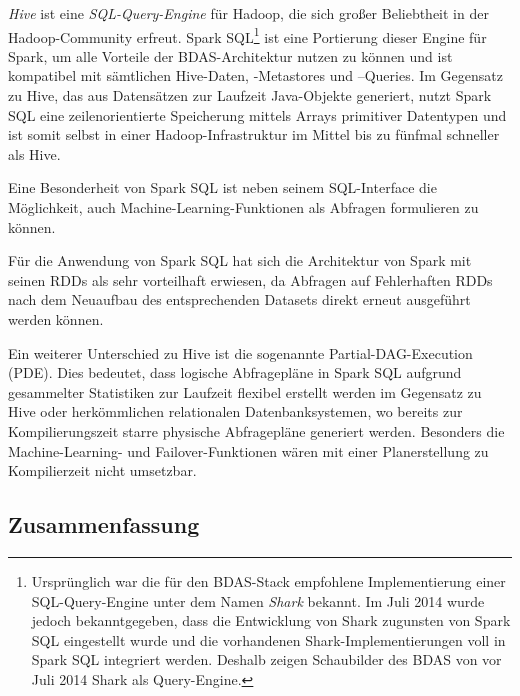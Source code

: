\textit{Hive} ist eine \textit{SQL-Query-Engine} für Hadoop, die sich großer Beliebtheit in der Hadoop-Community erfreut. Spark SQL\footnote{Ursprünglich war die für den BDAS-Stack empfohlene Implementierung einer SQL-Query-Engine unter dem Namen \textit{Shark} bekannt. Im Juli 2014 wurde jedoch bekanntgegeben, dass die Entwicklung von Shark zugunsten von Spark SQL eingestellt wurde und die vorhandenen Shark-Implementierungen voll in Spark SQL integriert werden. Deshalb zeigen Schaubilder des BDAS von vor Juli 2014 Shark als Query-Engine.} ist eine Portierung dieser Engine für Spark, um alle Vorteile der BDAS-Architektur nutzen zu können und ist kompatibel mit sämtlichen Hive-Daten, -Metastores und –Queries. Im Gegensatz zu Hive, das aus Datensätzen zur Laufzeit Java-Objekte generiert, nutzt Spark SQL eine zeilenorientierte Speicherung mittels Arrays primitiver Datentypen und ist somit selbst in einer Hadoop-Infrastruktur im Mittel bis zu fünfmal schneller als Hive. 

Eine Besonderheit von Spark SQL ist neben seinem SQL-Interface die Möglichkeit, auch Machine-Learning-Funktionen als Abfragen formulieren zu können. 

Für die Anwendung von Spark SQL hat sich die Architektur von Spark mit seinen RDDs als sehr vorteilhaft erwiesen, da Abfragen auf Fehlerhaften RDDs nach dem Neuaufbau des entsprechenden Datasets direkt erneut ausgeführt werden können. 

Ein weiterer Unterschied zu Hive ist die sogenannte Partial-DAG-Execution (PDE). Dies bedeutet, dass logische Abfragepläne in Spark SQL aufgrund gesammelter Statistiken zur Laufzeit flexibel erstellt werden im Gegensatz zu Hive oder herkömmlichen relationalen Datenbanksystemen, wo bereits zur Kompilierungszeit starre physische Abfragepläne generiert werden. Besonders die Machine-Learning- und Failover-Funktionen wären mit einer Planerstellung zu Kompilierzeit nicht umsetzbar. 






\subsection{Zusammenfassung}
\label{section:storm}





